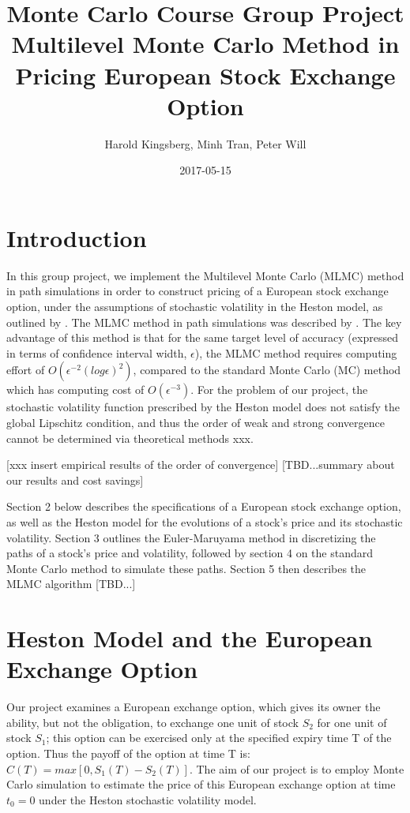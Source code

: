 \documentclass{article}
\title{Monte Carlo Course Group Project \\ 
Multilevel Monte Carlo Method in Pricing European Stock Exchange Option}
\author{Harold Kingsberg, Minh Tran, Peter Will}
\date{2017-05-15}
\begin{document}
\maketitle
\tableofcontents

\newpage
\section{Introduction} 
	In this group project, we implement the Multilevel Monte Carlo (MLMC) method in path simulations in order to construct pricing of a European stock exchange option, under the assumptions of stochastic volatility in the Heston model, as outlined by \cite{heston93}. The MLMC method in path simulations was described by \cite{giles08}. The key advantage of this method is that for the same target level of accuracy (expressed in terms of confidence interval width, $\epsilon$), the MLMC method requires computing effort of $O(\epsilon^{-2}(log\epsilon)^2)$, compared to the standard Monte Carlo (MC) method which has computing cost of $O(\epsilon^{-3})$. For the problem of our project, the stochastic volatility function prescribed by the Heston model does not satisfy the global Lipschitz condition, and thus the order of weak and strong convergence cannot be determined \cite{giles08} via theoretical methods xxx.
	
	[xxx insert empirical results of the order of convergence]
	[TBD...summary about our results and cost savings]
	
	Section 2 below describes the specifications of a European stock exchange option, as well as the Heston model for the evolutions of a stock's price and its stochastic volatility. Section 3 outlines the Euler-Maruyama method in discretizing the paths of a stock's price and volatility, followed by section 4 on the standard Monte Carlo method to simulate these paths. Section 5 then describes the MLMC algorithm [TBD...]

\section{Heston Model and the European Exchange Option}
	Our project examines a European exchange option, which gives its owner the ability, but not the obligation, to exchange one unit of stock $S_2$ for one unit of stock $S_1$; this option can be exercised only at the specified expiry time T of the option. Thus the payoff of the option at time T is: $C(T)=max[0, S_1(T)-S_2(T)]$. The aim of our project is to employ Monte Carlo simulation to estimate the price of this European exchange option at time $t_0=0$ under the Heston stochastic volatility model.
    
\end{document}
